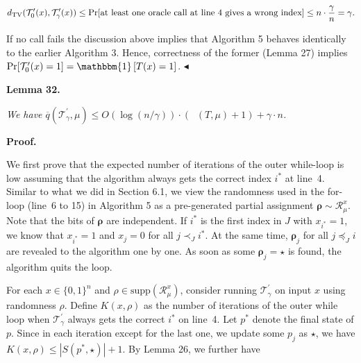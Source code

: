 \[\begin{gathered}
d_{\mathrm{TV}}(\mathcal{T}^{\prime}_{0}(x),\mathcal{T}^{\prime}_{\gamma}(x))\leq\Pr[\text{at least one oracle call at line\nobreak\ 4 gives a wrong index}]\leq n\cdot\frac{\gamma}{n}=\gamma.
\end{gathered}\]


If no call fails the discussion above implies that Algorithm 5 behaves identically to the earlier Algorithm 3. Hence, correctness of the former (Lemma 27) implies $\Pr[\mathcal{T}^{\prime}_{0}(x)=1]=\mathbbm{1}\left[T(x)=1\right]$.
$\blacktriangleleft$\par





\par\medskip\noindent\textbf{
\textbf{Lemma 32}\textbf{.}
}\par



\emph{We have $\overline{q}(\mathcal{T}^{\prime}_{\gamma},\mu)\leq O(\log(n/\gamma))\cdot(\mathop{\overline{sq}}(T,\mu)+1)+\gamma\cdot n$.}\par







\par\medskip\noindent\textbf{Proof.}\par




We first prove that the expected number of iterations of the outer while-loop is low assuming that the algorithm always gets the correct index $i^{*}$ at line 4. Similar to what we did in Section 6.1, we view the randomness used in the for-loop (line 6 to 15) in Algorithm 5 as a pre-generated partial assignment $\bm{\rho}\sim\mathcal{R}_{\mu}^{x}$. Note that the bits of $\bm{\rho}$ are independent. If $i^{*}$ is the first index in $J$ with $x_{i^{*}}=1$, we know that $x_{i^{*}}=1$ and $x_{j}=0$ for all $j\prec_{J}i^{*}$. At the same time, $\bm{\rho}_{j}$ for all $j\preceq_{J}i$ are revealed to the algorithm one by one. As soon as some $\bm{\rho}_{j}=\star$ is found, the algorithm quits the loop.\par




For each $x\in\{0,1\}^{n}$ and $\rho\in\mathrm{supp}(\mathcal{R}_{\mu}^{x})$, consider running $\mathcal{T}^{\prime}_{\gamma}$ on input $x$ using randomness $\rho$.
Define $K(x,\rho)$ as the number of iterations of the outer while loop when $\mathcal{T}^{\prime}_{\gamma}$ always gets the correct $i^{*}$ on line 4. Let $p^{*}$ denote the final state of $p$. Since in each iteration except for the last one, we update some $p_{j}$ as $\star$, we have $K(x,\rho)\leq|S(p^{*},\star)|+1$. By Lemma 26, we further have\par


